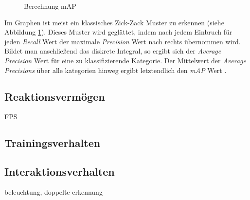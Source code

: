 \begin{figure}[ht]
	\caption[Berechnung mAP]{Berechnung mAP \cite{JonathanHui.20180307}} 
	\label{map}
\end{figure} 

Im Graphen ist meist ein klassisches \glqq Zick-Zack\grqq{} Muster zu erkennen (siehe Abbildung \ref{map}). Dieses Muster wird geglättet, indem nach jedem Einbruch für jeden \textit{Recall} Wert der maximale \textit{Precision} Wert nach rechts übernommen wird. Bildet man anschließend das diskrete Integral, so ergibt sich der \textit{Average Precision} Wert für eine zu klassifizierende Kategorie. Der Mittelwert der  \textit{Average Precisions} über alle kategorien hinweg ergibt letztendlich den \textit{mAP} Wert \cite{JonathanHui.20180307}. 

\subsection*{Reaktionsvermögen}

FPS

\subsection*{Trainingsverhalten}


\subsection*{Interaktionsverhalten}

beleuchtung, doppelte erkennung

